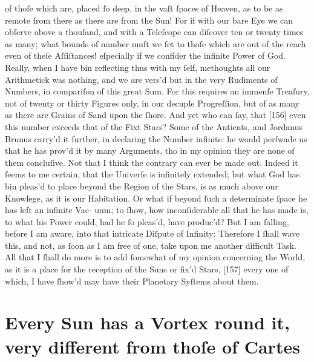\documentclass[letterpaper]{book}
\begin{document}
of thoſe which are, placed ſo deep, in the vaſt ſpaces of Heaven, as to be
as remote from there as there are from the Sun! For if with our bare Eye
we can obſerve above a thouſand, and with a Teleſcope can diſcover ten or
twenty times as many; what bounds of number muſt we ſet to thoſe which
are out of the reach even of theſe Aſſiſtances! eſpecially if we confider
the infinite Power of God. Really, when I have bin reflecting thus with my
ſelf, methoughts all our Arithmetick was nothing, and we are vers'd but
in the very Rudiments of Numbers, in compariſon of this great Sum. For
this requires an immenſe Treaſury, not of twenty or thirty Figures only, in
our decuple Progreſſion, but of as many as there are Grains of Sand upon
the ſhore. And yet who can ſay, that [156] even this number exceeds that
of the Fixt Stars? Some of the Antients, and Jordanus Brunus carry'd it
further, in declaring the Number infinite: he would perſwade us that he has
prov'd it by many Arguments, tho in my opinion they are none of them
concluſive. Not that I think the contrary can ever be made out. Indeed it
ſeems to me certain, that the Univerſe is infinitely extended; but what God
has bin pleas'd to place beyond the Region of the Stars, is as much above
our Knowlege, as it is our Habitation.
Or what if beyond ſuch a determinate ſpace he has left an infinite Vac-
uum; to ſhow, how inconſiderable all that he has made is, to what his Power
could, had he ſo pleas'd, have produc'd? But I am falling, before I am aware,
into that intricate Diſpute of Infinity: Therefore I ſhall wave this, and not,
as ſoon as I am free of one, take upon me another difficult Task. All that I
ſhall do more is to add ſomewhat of my opinion concerning the World, as
it is a place for the reception of the Suns or fix'd Stars, [157] every one of
which, I have ſhow'd may have their Planetary Syſtems about them.


\section{Every Sun has a Vortex round it, very different from thoſe of Cartes}
\end{document}
